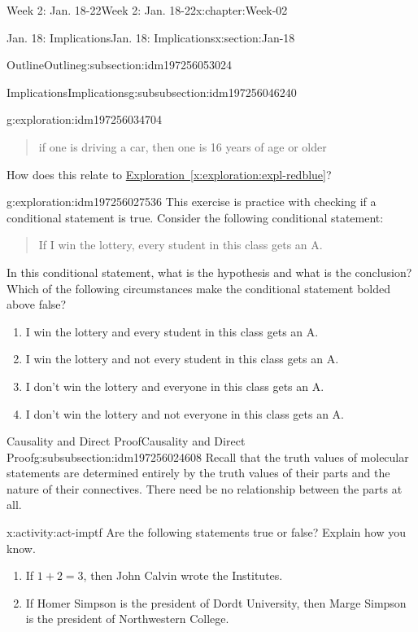 \documentclass[oneside,10pt,]{book}
\newcommand{\xreffont}{\relax}
\numberwithin{equation}{section}
\begin{document}
\begin{chapterptx}{Week 2: Jan. 18-22}{}{Week 2: Jan. 18-22}{}{}{x:chapter:Week-02}
\begin{sectionptx}{Jan. 18: Implications}{}{Jan. 18: Implications}{}{}{x:section:Jan-18}
\begin{subsectionptx}{Outline}{}{Outline}{}{}{g:subsection:idm197256053024}
\begin{subsubsectionptx}{Implications}{}{Implications}{}{}{g:subsubsection:idm197256046240}
\begin{exploration}{}{g:exploration:idm197256034704}
\begin{quote}%
if one is driving a car, then one is 16 years of age or older\end{quote}
How does this relate to \hyperref[x:exploration:expl-redblue]{Exploration~{\xreffont\ref{x:exploration:expl-redblue}}}?%
\end{exploration}%
\begin{exploration}{}{g:exploration:idm197256027536}%
This exercise is practice with checking if a conditional statement is true. Consider the following conditional statement: \begin{quote}%
If I win the lottery, every student in this class gets an A.\end{quote}
 In this conditional statement, what is the hypothesis and what is the conclusion? Which of the following circumstances make the conditional statement bolded above false?%
%
\begin{enumerate}
\item{}I win the lottery and every student in this class gets an A.%
\item{}I win the lottery and not every student in this class gets an A.%
\item{}I don’t win the lottery and everyone in this class gets an A.%
\item{}I don’t win the lottery and not everyone in this class gets an A.%
\end{enumerate}
\end{exploration}%
\end{subsubsectionptx}
%
%
\typeout{************************************************}
\typeout{************************************************}
%
\begin{subsubsectionptx}{Causality and Direct Proof}{}{Causality and Direct Proof}{}{}{g:subsubsection:idm197256024608}
Recall that the truth values of molecular statements are determined entirely by the truth values of their parts and the nature of their connectives. There need be no relationship between the parts at all.%
\begin{activity}{}{x:activity:act-imptf}%
Are the following statements true or false? Explain how you know.%
%
\begin{enumerate}
\item{}If \(1+2=3\), then John Calvin wrote the Institutes.%
\item{}If Homer Simpson is the president of Dordt University, then Marge Simpson is the president of Northwestern College.%

\end{enumerate}
\end{activity}
\end{subsubsectionptx}
\end{subsectionptx}
\end{sectionptx}
\end{chapterptx}
\end{document}

